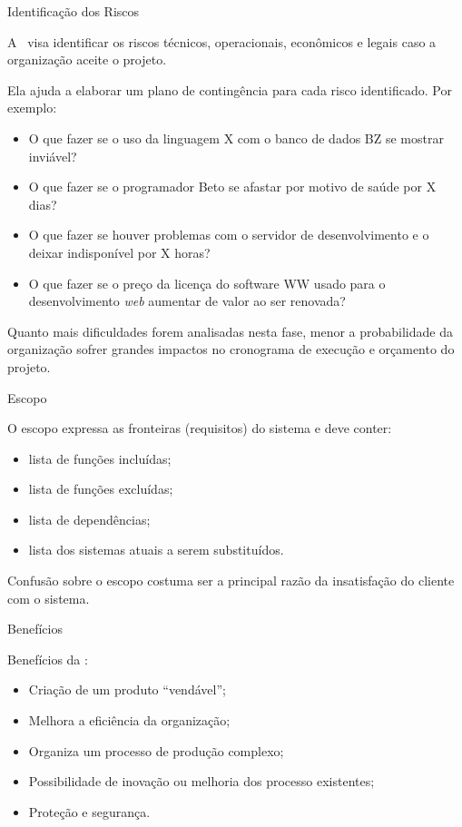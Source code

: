 \begin{frame}{Identificação dos Riscos}\small
  
  A \insertlecture\ visa identificar os \alert{riscos} técnicos, operacionais, 
  econômicos e legais caso a organização aceite o projeto.

  \bigskip\pause

  Ela ajuda a elaborar um plano de contingência para cada risco identificado. Por exemplo:
  \begin{itemize}[<+->]
  \item O que fazer se o uso da linguagem X com o banco de dados BZ se mostrar inviável?
  \item O que fazer se o programador Beto se afastar por motivo de saúde por X dias?
  \item O que fazer se  houver problemas com o servidor de desenvolvimento e o deixar 
    indisponível por X horas?
  \item O que fazer se o preço da licença do software WW usado para o desenvolvimento 
    {\em web} aumentar de valor ao ser renovada?
  \end{itemize}

  \pause
  
  Quanto mais dificuldades forem analisadas nesta fase, menor a
  probabilidade da organização sofrer grandes impactos no cronograma
  de execução e orçamento do projeto.
\end{frame}

\begin{frame}{\insertlecture}{Escopo}
  
  O \alert{escopo} expressa as \alert{fronteiras} (requisitos) do sistema e deve conter:
  \begin{itemize}[<+->]
  \item lista de \alert{funções incluídas};
  \item lista de \alert{funções excluídas};
  \item lista de \alert{dependências};
  \item lista dos \alert{sistemas atuais a serem substituídos}.
  \end{itemize}

  \bigskip\pause
  Confusão sobre o escopo costuma ser a principal razão da insatisfação 
  do cliente com o sistema.
\end{frame}

\begin{frame}{\insertlecture}{Benefícios}
  
  Benefícios da \insertlecture:

  \begin{itemize}[<+->]
  \item Criação de um produto ``vendável'';
  \item Melhora a eficiência da organização;
  \item Organiza um processo de produção complexo;
  \item Possibilidade de inovação ou melhoria dos processo existentes;
  \item Proteção e segurança.
  \end{itemize}
\end{frame}

